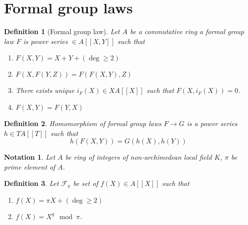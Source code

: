 \documentclass[twoside, 12pt]{iiser-thesis}
\newtheorem{defi}{ Definition}[section]
\newtheorem{notation}{ Notation}[section]
\begin{document}
\section{Formal group laws}
\begin{defi}[Formal group law]
        Let $A$ be a commutative ring a formal group law $F$ is power series $\in A[[X,Y]]$ such that 
        \begin{enumerate}
        \item $F(X,Y)=X+Y + (\deg \geq 2)$ 
        \item $F(X, F(Y,Z))=F(F(X,Y),Z)$
        \item There exists unique $i_F(X) \in XA[[X]]$ such that $F(X,i_F(X))=0$.
        \item $F(X,Y)=F(Y,X)$
        \end{enumerate}
\end{defi}
		\begin{defi}Homomorphism of formal group laws
		$F\rightarrow G$ is a power series $h\in TA[[T]]$ such that $$h(F(X,Y))=G(h(X),h(Y))$$
		\end{defi}
\begin{notation}
Let $A$ be ring of integers of non-archimedean local field $K$, $\pi$ be prime element of $A$.

\end{notation}	
\begin{defi}
Let $\mathcal F_\pi$ be set of $f(X) \in A[[X]]$ such that 
\begin{enumerate}
    \item $f(X)= \pi X + (\deg \geq 2)$ 
    \item $f(X)=X^q \mod \pi$.
\end{enumerate}
\end{defi}
\end{document}
